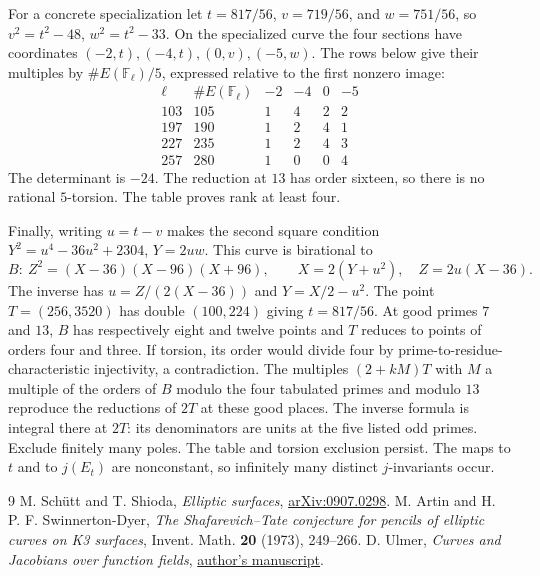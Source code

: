 \documentclass[11pt]{article}
\newcommand{\F}{\mathbb F}
\begin{document}
For a concrete specialization let $t=817/56$,
$v=719/56$, and $w=751/56$, so $v^2=t^2-48$, $w^2=t^2-33$.
On the specialized curve the four sections have coordinates
$(-2,t),(-4,t),(0,v),(-5,w)$. The rows below give their multiples by
$\#E(\F_\ell)/5$, expressed relative to the first nonzero image:
\[
\begin{array}{r|r|rrrr}
\ell&\#E(\F_\ell)&-2&-4&0&-5\\\hline
103&105&1&4&2&2\\
197&190&1&2&4&1\\
227&235&1&2&4&3\\
257&280&1&0&0&4
\end{array}
\]
The determinant is $-24$. The reduction at $13$ has order sixteen, so
there is no rational $5$-torsion. The table proves rank at least four.

Finally, writing $u=t-v$ makes the second square condition
$Y^2=u^4-36u^2+2304$, $Y=2uw$. This curve is birational to
\[
 B:\ Z^2=(X-36)(X-96)(X+96),\qquad
 X=2(Y+u^2),\quad Z=2u(X-36).
\]
The inverse has $u=Z/(2(X-36))$ and $Y=X/2-u^2$.
The point $T=(256,3520)$ has double $(100,224)$ giving $t=817/56$.
At good primes $7$ and $13$, $B$ has respectively eight and twelve
points and $T$ reduces to points of orders four and three. If
torsion, its order would divide four by prime-to-residue-characteristic
injectivity, a contradiction. The multiples $(2+kM)T$ with $M$ a
multiple of the orders of $B$ modulo the four tabulated primes and
modulo $13$ reproduce the reductions of $2T$ at these good places.
The inverse formula is integral there at $2T$: its denominators
are units at the five listed odd primes.
Exclude finitely many poles. The table and torsion exclusion persist.
The maps to $t$ and to $j(E_t)$ are nonconstant, so infinitely many
distinct $j$-invariants occur.

\begin{thebibliography}{9}
 M. Sch\"utt and T. Shioda,
\emph{Elliptic surfaces}, \href{https://arxiv.org/abs/0907.0298}{arXiv:0907.0298}.
 M. Artin and H. P. F. Swinnerton-Dyer,
\emph{The Shafarevich--Tate conjecture for pencils of elliptic curves on K3 surfaces},
Invent. Math. \textbf{20} (1973), 249--266.
 D. Ulmer, \emph{Curves and Jacobians over function fields},
\href{https://math.arizona.edu/~ulmer/research/papers/2014b.pdf}{author's manuscript}.
\end{thebibliography}
\end{document}
